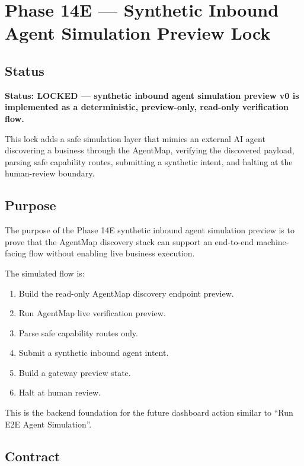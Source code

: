 \section{Phase 14E --- Synthetic Inbound Agent Simulation Preview Lock}
\label{sec:phase14e-agentmap-synthetic-agent-simulation-lock}

\subsection{Status}

\textbf{Status: LOCKED --- synthetic inbound agent simulation preview v0 is implemented as a deterministic, preview-only, read-only verification flow.}

This lock adds a safe simulation layer that mimics an external AI agent discovering a business through the AgentMap, verifying the discovered payload, parsing safe capability routes, submitting a synthetic intent, and halting at the human-review boundary.

\subsection{Purpose}

The purpose of the Phase 14E synthetic inbound agent simulation preview is to prove that the AgentMap discovery stack can support an end-to-end machine-facing flow without enabling live business execution.

The simulated flow is:

\begin{enumerate}
  \item Build the read-only AgentMap discovery endpoint preview.
  \item Run AgentMap live verification preview.
  \item Parse safe capability routes only.
  \item Submit a synthetic inbound agent intent.
  \item Build a gateway preview state.
  \item Halt at human review.
\end{enumerate}

This is the backend foundation for the future dashboard action similar to ``Run E2E Agent Simulation''.

\subsection{Contract}

